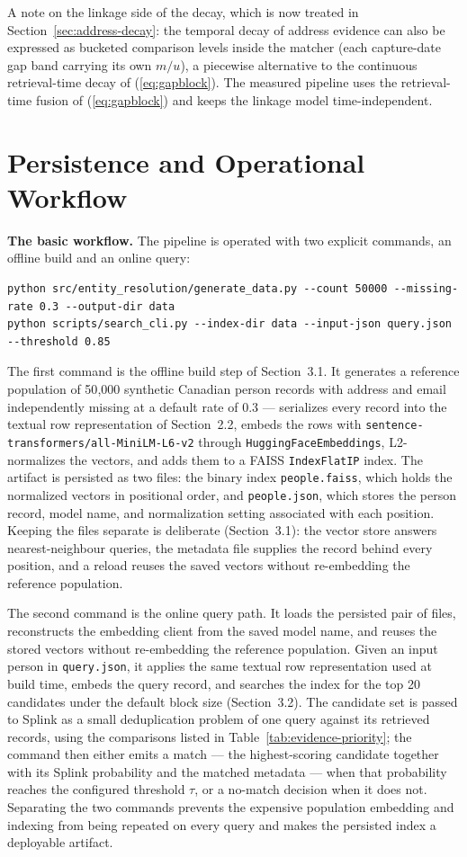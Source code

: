 \documentclass[11pt]{article}
\begin{document}
A note on the linkage side of the decay, which is now treated in Section~\ref{sec:address-decay}: the temporal decay of address evidence can also be expressed as bucketed comparison levels inside the matcher (each capture-date gap band carrying its own $m/u$), a piecewise alternative to the continuous retrieval-time decay of (\ref{eq:gapblock}). The measured pipeline uses the retrieval-time fusion of (\ref{eq:gapblock}) and keeps the linkage model time-independent.

\section{Persistence and Operational Workflow}
\textbf{The basic workflow.} The pipeline is operated with two explicit commands, an offline build and an online query:
{\footnotesize
\begin{verbatim}
python src/entity_resolution/generate_data.py --count 50000 --missing-rate 0.3 --output-dir data
python scripts/search_cli.py --index-dir data --input-json query.json --threshold 0.85
\end{verbatim}
}

The first command is the offline build step of Section~3.1. It generates a reference population of 50{,}000 synthetic Canadian person records with address and email independently missing at a default rate of 0.3 --- serializes every record into the textual row representation of Section~2.2, embeds the rows with {\footnotesize\texttt{sentence-transformers/all-MiniLM-L6-v2}} through \texttt{HuggingFaceEmbeddings}, L2-normalizes the vectors, and adds them to a FAISS \texttt{IndexFlatIP} index. The artifact is persisted as two files: the binary index \texttt{people.faiss}, which holds the normalized vectors in positional order, and \texttt{people.json}, which stores the person record, model name, and normalization setting associated with each position. Keeping the files separate is deliberate (Section~3.1): the vector store answers nearest-neighbour queries, the metadata file supplies the record behind every position, and a reload reuses the saved vectors without re-embedding the reference population.

The second command is the online query path. It loads the persisted pair of files, reconstructs the embedding client from the saved model name, and reuses the stored vectors without re-embedding the reference population. Given an input person in \texttt{query.json}, it applies the same textual row representation used at build time, embeds the query record, and searches the index for the top 20 candidates under the default block size (Section~3.2). The candidate set is passed to Splink as a small deduplication problem of one query against its retrieved records, using the comparisons listed in Table~\ref{tab:evidence-priority}; the command then either emits a match --- the highest-scoring candidate together with its Splink probability and the matched metadata --- when that probability reaches the configured threshold $\tau$, or a no-match decision when it does not. Separating the two commands prevents the expensive population embedding and indexing from being repeated on every query and makes the persisted index a deployable artifact.
\end{document}
